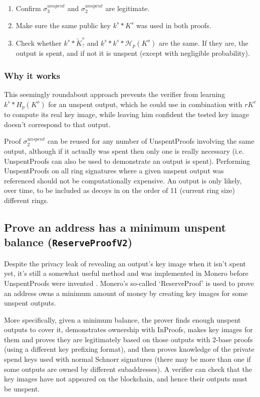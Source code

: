 \begin{enumerate}
    \item Confirm $\sigma^{unspent}_3$ and $\sigma^{unspent}_2$ are legitimate.
    \item Make sure the same public key $k^s*K^s$ was used in both proofs.
    \item Check whether $k^s*\tilde{K}^s_?$ and $k^s*k^s*\mathcal{H}_p(K^o)$ are the same. If they are, the output is spent, and if not it is unspent (except with negligible probability).
\end{enumerate}{}

\subsubsection*{Why it works}

This seemingly roundabout approach prevents the verifier from learning $k^s*H_p(K^o)$ for an unspent output, which he could use in combination with $r K^v$ to compute its real key image, while leaving him confident the tested key image doesn't correspond to that output.

Proof $\sigma^{unspent}_2$ can be reused for any number of UnspentProofs involving the same output, although if it actually was spent then only one is really necessary (i.e. UnspentProofs can also be used to demonstrate an output is spent). Performing UnspentProofs on all ring signatures where a given unspent output was referenced should not be computationally expensive. An output is only likely, over time, to be included as decoys in on the order of 11 (current ring size) different rings.


\subsection{Prove an address has a minimum unspent balance ({\tt ReserveProofV2})}
\label{subsec:proofs-minimum-balance-reserveproof}

Despite the privacy leak of revealing an output's key image when it isn't spent yet, it's still a somewhat useful method and was implemented in Monero \cite{reserveproofs-pull-request-3027} before UnspentProofs were invented \cite{unspent-proof-issue-68}. Monero's so-called `ReserveProof' is used to prove an address owns a minimum amount of money by creating key images for some unspent outputs.

More specifically, given a minimum balance, the prover finds enough unspent outputs to cover it, demonstrates ownership with InProofs, makes key images for them and proves they are legitimately based on those outputs with 2-base proofs (using a different key prefixing format), and then proves knowledge of the private spend keys used with normal Schnorr signatures (there may be more than one if some outputs are owned by different subaddresses). A verifier can check that the key images have not appeared on the blockchain, and hence their outputs must be unspent.

